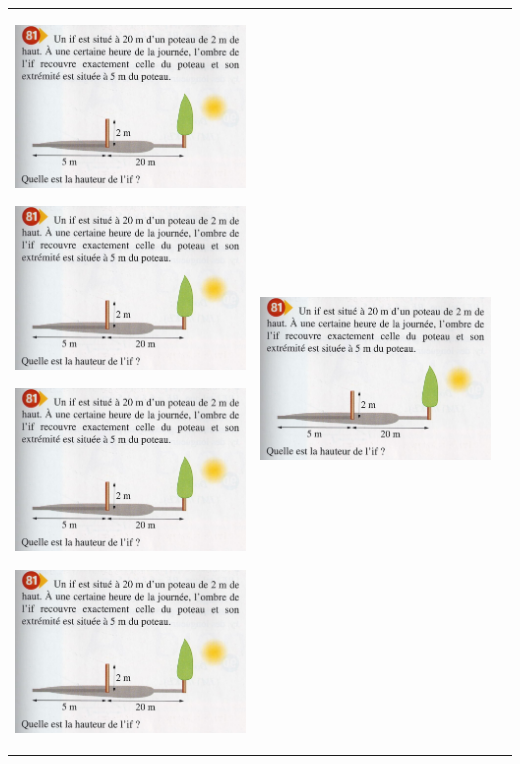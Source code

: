 \documentclass[12pt, twoside]{article}
\begin{document}
\begin{landscape}
\begin{tabular}{ccc}
\begin{minipage}{8cm}
\includegraphics[width=7cm]{images/ex81.jpg}




\includegraphics[width=7cm]{images/ex81.jpg}



\includegraphics[width=7cm]{images/ex81.jpg}


\includegraphics[width=7cm]{images/ex81.jpg}
\end{minipage}
&
\begin{minipage}{8cm}
\includegraphics[width=7cm]{images/ex81.jpg}





\end{minipage}
\end{tabular}
\end{landscape}
\end{document}
